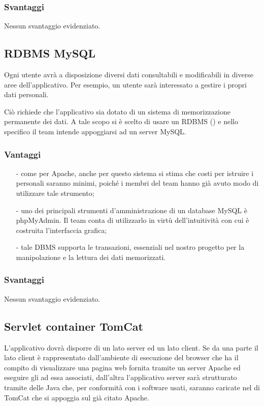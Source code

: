 \subsubsection*{Svantaggi}
Nessun svantaggio evidenziato.
  
\subsection{RDBMS MySQL}

Ogni utente avrà a disposizione diversi dati consultabili e modificabili in diverse aree dell'applicativo. Per esempio, un utente sarà interessato a gestire i propri dati personali.

Ciò richiede che l'applicativo sia dotato di un sistema di memorizzazione permanente dei dati. A tale scopo si è scelto di usare un RDBMS () e nello specifico  il team intende appoggiarsi ad un server MySQL\@.

\subsubsection*{Vantaggi}

\begin{itemize}[noitemsep,nolistsep]
  \item[-] come per Apache, anche per questo sistema si stima che costi per istruire i personali saranno minimi, poiché i membri del team hanno già avuto modo di utilizzare tale strumento;
  \item[-] uno dei principali strumenti d'amministrazione di un database MySQL è phpMyAdmin. Il team conta di utilizzarlo in virtù dell'intuitività con cui è costruita l'interfaccia grafica;
  \item[-] tale DBMS supporta le transazioni, essenziali nel nostro progetto per la manipolazione e la lettura dei dati memorizzati.
\end{itemize}

\subsubsection*{Svantaggi}
Nessun svantaggio evidenziato.

\subsection{Servlet container TomCat}

L'applicativo dovrà disporre di un lato server ed un lato client. Se da una parte il lato client è rappresentato dall'ambiente di esecuzione del browser che ha il compito di visualizzare una pagina web fornita tramite un server Apache ed eseguire gli  ad essa associati, dall'altra l'applicativo server sarà strutturato tramite delle  Java che, per conformità con i software usati, saranno caricate nel  di TomCat che si appoggia sul già citato Apache.

